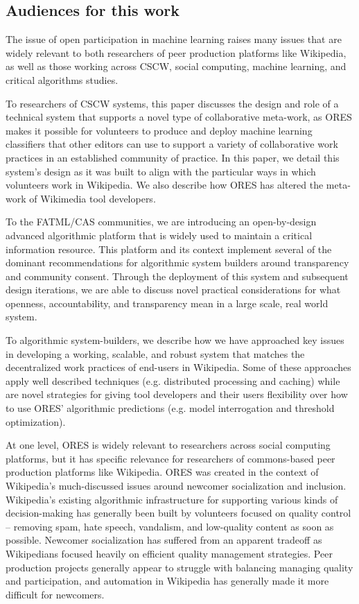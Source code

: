 \subsection{Audiences for this work}
The issue of open participation in machine learning raises many issues that are widely relevant to both researchers of peer production platforms like Wikipedia, as well as those working across CSCW, social computing, machine learning, and critical algorithms studies.

To researchers of CSCW systems, this paper discusses the design and role of a technical system that supports a novel type of collaborative meta-work, as ORES makes it possible for volunteers to produce and deploy machine learning classifiers that other editors can use to support a variety of collaborative work practices in an established community of practice. In this paper, we detail this system's design as it was built to align with the particular ways in which volunteers work in Wikipedia. We also describe how ORES has altered the meta-work of Wikimedia tool developers.

To the FATML/CAS communities, we are introducing an open-by-design advanced algorithmic platform that is widely used to maintain a critical information resource.  This platform and its context implement several of the dominant recommendations for algorithmic system builders around transparency and community consent.  Through the deployment of this system and subsequent design iterations, we are able to discuss novel practical considerations for what openness, accountability, and transparency mean in a large scale, real world system.

To algorithmic system-builders, we describe how we have approached key issues in developing a working, scalable, and robust system that matches the decentralized work practices of end-users in Wikipedia.  Some of these approaches apply well described techniques (e.g. distributed processing and caching) while are novel strategies for giving tool developers and their users flexibility over how to use ORES’ algorithmic predictions (e.g. model interrogation and threshold optimization).

At one level, ORES is widely relevant to researchers across social computing platforms, but it has specific relevance for researchers of commons-based peer production platforms like Wikipedia. ORES was created in the context of Wikipedia’s much-discussed issues around newcomer socialization and inclusion. Wikipedia’s existing algorithmic infrastructure for supporting various kinds of decision-making has generally been built by volunteers focused on quality control -- removing spam, hate speech, vandalism, and low-quality content as soon as possible. Newcomer socialization has suffered from an apparent tradeoff as Wikipedians focused heavily on efficient quality management strategies\cite{halfaker2013rise, halfaker2014snuggle}. Peer production projects generally appear to struggle with balancing managing quality and participation\cite{teblunthuis2018revisiting}, and automation in Wikipedia has generally made it more difficult for newcomers.

